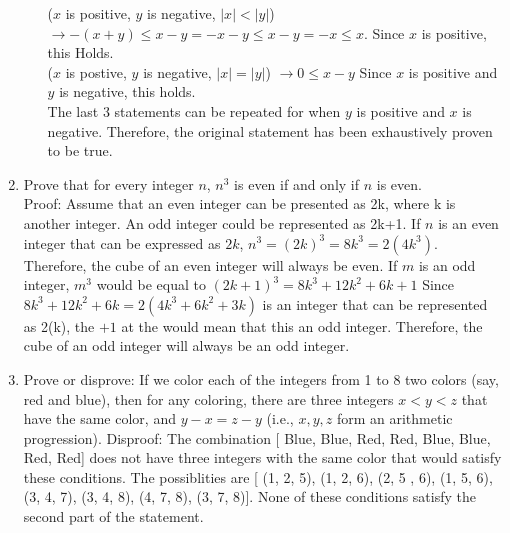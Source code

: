 \documentclass{article}
\begin{document}
\begin{enumerate}
\begin{enumerate}
            ($x$ is positive, $y$ is negative, $|x| < |y|$) $\rightarrow -(x+y) \leq x-y = -x-y \leq x-y = -x \leq x$. Since $x$ is positive, this Holds. \\
            ($x$ is postive, $y$ is negative, $|x| = |y|$) $\rightarrow 0 \leq x - y$  Since $x$ is positive and $y$ is negative, this holds. \\
            The last 3 statements can be repeated for when $y$ is positive and $x$ is negative. Therefore, the original statement has been exhaustively proven to be true. \Squaresteel
    \end{enumerate}
\item Prove that for every integer $n$, $n^3$ is even if and only if $n$ is even. \\
    Proof: Assume that an even integer can be presented as 2k, where k is another integer. An odd integer could be represented as 2k+1. If $n$ is an even integer that can be expressed as $2k$, $n^3 = (2k)^3 = 8k^3 = 2(4k^3)$. Therefore, the cube of an even integer will always be even. If $m$ is an odd integer, $m^3$ would be equal to $(2k+1)^3 = 8k^3 + 12k^2 + 6k + 1$ Since $8k^3 + 12k^2 + 6k = 2(4k^3+6k^2+3k)$ is an integer that can be represented as 2(k), the $+1$ at the would mean that this an odd integer. Therefore, the cube of an odd integer will always be an odd integer.
\item Prove or disprove: If we color each of the integers from 1 to 8 two colors (say, red and blue), then for any coloring, there are three integers $x<y<z$ that have the same color, and $y-x=z-y$ (i.e., $x,y,z$ form an arithmetic progression).
    Disproof: The combination [\color{Blue} Blue, Blue, \color{Red} Red, Red, \color{Blue} Blue, Blue, \color{Red} Red, Red] \color{Black} does not have three integers with the same color that would satisfy these conditions. The possiblities are [\color{Blue} (1, 2, 5), (1, 2, 6), (2, 5 , 6), (1, 5, 6), \color{Red} (3, 4, 7), (3, 4, 8), (4, 7, 8), (3, 7, 8)\color{Black}]. None of these conditions satisfy the second part of the statement. 
\end{enumerate}
\end{document}
